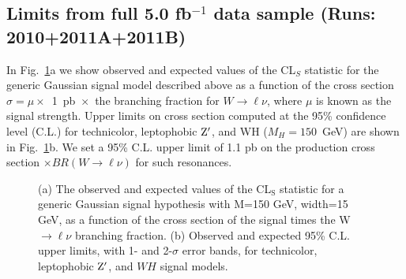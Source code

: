 \subsection{Limits from full \texorpdfstring{5.0 fb${}^{-1}$}{5.0/fb} data sample (Runs: 2010+2011A+2011B)}
In Fig.~\ref{fig:FigLimitsFullData}a we show observed and expected values of the
CL${}_{S}$ statistic for the generic Gaussian signal model described above
as a function of the cross section $\sigma = \mu \times$~1~pb~$\times$~the branching fraction
for $W\to\ell\nu$, where $\mu$ is
known as the signal strength.
Upper limits on cross section computed at the 95\% confidence level (C.L.)
for technicolor, leptophobic $\mathrm{Z}^\prime$, and WH ($M_H = 150$~GeV) are 
shown in Fig.~\ref{fig:FigLimitsFullData}b.
We set a 95\% C.L. upper limit of 1.1 pb on the production cross section 
$\times BR(W\to\ell\nu)$ for such resonances.
\begin{figure}[bthp]
\caption{\label{fig:FigLimitsFullData}
(a) The observed and expected values of the CL${}_{\textrm{S}}$ statistic for a
generic Gaussian signal hypothesis with M=150 GeV, width=15 GeV, as a
function of the cross section of the signal times the W$\to\ell\nu$ branching
fraction.
(b) Observed and expected 95\% C.L. upper limits, with 1- and 2-$\sigma$ 
error bands, for technicolor, leptophobic $\mathrm{Z}^\prime$, and $WH$ signal models. 
}
\end{figure}
